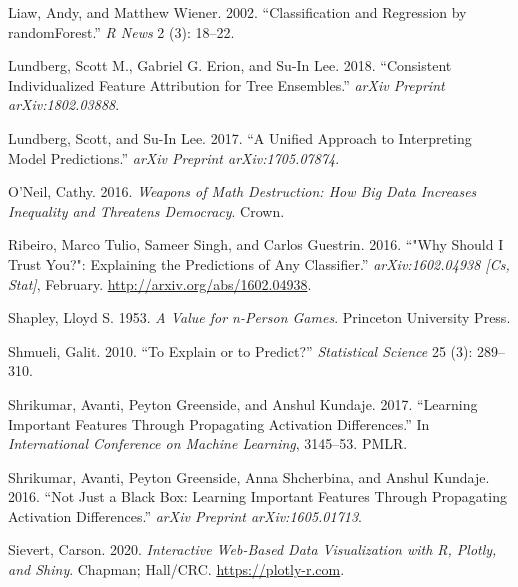 \documentclass[
]{article}
\newlength{\cslhangindent}
\newlength{\cslentryspacingunit} %
\newenvironment{CSLReferences}[2] %
 {%
  \setlength{\parindent}{0pt}
  \ifodd #1
  \let\oldpar\par
  \def\par{\hangindent=\cslhangindent\oldpar}
  \fi
  \setlength{\parskip}{#2\cslentryspacingunit}
 }%
 {}
\begin{document}
\begin{CSLReferences}{1}{0}
\leavevmode{}%
Liaw, Andy, and Matthew Wiener. 2002. {``Classification and Regression
by {randomForest}.''} \emph{R News} 2 (3): 18--22.

\leavevmode{}%
Lundberg, Scott M., Gabriel G. Erion, and Su-In Lee. 2018. {``Consistent
Individualized Feature Attribution for Tree Ensembles.''} \emph{arXiv
Preprint arXiv:1802.03888}.

\leavevmode{}%
Lundberg, Scott, and Su-In Lee. 2017. {``A Unified Approach to
Interpreting Model Predictions.''} \emph{arXiv Preprint
arXiv:1705.07874}.

\leavevmode{}%
O'Neil, Cathy. 2016. \emph{Weapons of Math Destruction: {How} Big Data
Increases Inequality and Threatens Democracy}. Crown.

\leavevmode{}%
Ribeiro, Marco Tulio, Sameer Singh, and Carlos Guestrin. 2016. {``"{Why}
{Should} {I} {Trust} {You}?": {Explaining} the {Predictions} of {Any}
{Classifier}.''} \emph{arXiv:1602.04938 {[}Cs, Stat{]}}, February.
\url{http://arxiv.org/abs/1602.04938}.

\leavevmode{}%
Shapley, Lloyd S. 1953. \emph{A Value for n-Person Games}. Princeton
University Press.

\leavevmode{}%
Shmueli, Galit. 2010. {``To Explain or to Predict?''} \emph{Statistical
Science} 25 (3): 289--310.

\leavevmode{}%
Shrikumar, Avanti, Peyton Greenside, and Anshul Kundaje. 2017.
{``Learning Important Features Through Propagating Activation
Differences.''} In \emph{International {Conference} on {Machine}
{Learning}}, 3145--53. PMLR.

\leavevmode{}%
Shrikumar, Avanti, Peyton Greenside, Anna Shcherbina, and Anshul
Kundaje. 2016. {``Not Just a Black Box: {Learning} Important Features
Through Propagating Activation Differences.''} \emph{arXiv Preprint
arXiv:1605.01713}.

\leavevmode{}%
Sievert, Carson. 2020. \emph{Interactive {Web}-{Based} {Data}
{Visualization} with {R}, Plotly, and Shiny}. Chapman; Hall/CRC.
\url{https://plotly-r.com}.


\end{CSLReferences}
\end{document}
